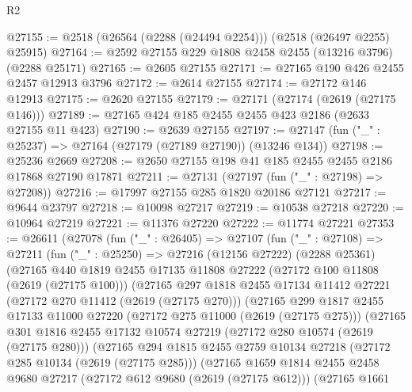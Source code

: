 \begin{lexlean}{R2}
\begin{coremodule}
@27155 := @2518 (@26564 (@2288 (@24494 @2254))) (@2518 (@26497 @2255) @25915)
@27164 := @2592 @27155 @229 @1808 @2458 @2455 (@13216 @3796) (@2288 @25171)
@27165 := @2605 @27155
@27171 := @27165 @190 @426 @2455 @2457 @12913 @3796
@27172 := @2614 @27155
@27174 := @27172 @146 @12913
@27175 := @2620 @27155
@27179 := @27171 (@27174 (@2619 (@27175 @146)))
@27189 := @27165 @424 @185 @2455 @2455 @423 @2186 (@2633 @27155 @11 @423)
@27190 := @2639 @27155
@27197 := @27147 (fun ("_" : @25237) => @27164 (@27179 (@27189 @27190)) (@13246 @134))
@27198 := @25236 @2669
@27208 := @2650 @27155 @198 @41 @185 @2455 @2455 @2186 @17868 @27190 @17871
@27211 := @27131 (@27197 (fun ("_" : @27198) => @27208))
@27216 := @17997 @27155 @285 @1820 @20186 @27121
@27217 := @9644 @23797
@27218 := @10098 @27217
@27219 := @10538 @27218
@27220 := @10964 @27219
@27221 := @11376 @27220
@27222 := @11774 @27221
@27353 := @26611
    (@27078
      (fun ("_" : @26405) =>
      @27107
        (fun ("_" : @27108) =>
        @27211
          (fun ("_" : @25250) =>
          @27216
            (@12156 @27222)
            (@2288 @25361)
            (@27165
              @440
              @1819
              @2455
              @17135
              @11808
              @27222
              (@27172 @100 @11808 (@2619 (@27175 @100)))
              (@27165
                @297
                @1818
                @2455
                @17134
                @11412
                @27221
                (@27172 @270 @11412 (@2619 (@27175 @270)))
                (@27165
                  @299
                  @1817
                  @2455
                  @17133
                  @11000
                  @27220
                  (@27172 @275 @11000 (@2619 (@27175 @275)))
                  (@27165
                    @301
                    @1816
                    @2455
                    @17132
                    @10574
                    @27219
                    (@27172 @280 @10574 (@2619 (@27175 @280)))
                    (@27165
                      @294
                      @1815
                      @2455
                      @2759
                      @10134
                      @27218
                      (@27172 @285 @10134 (@2619 (@27175 @285)))
                      (@27165
                        @1659
                        @1814
                        @2455
                        @2458
                        @9680
                        @27217
                        (@27172 @612 @9680 (@2619 (@27175 @612)))
                        (@27165
                          @1661

\end{coremodule}
\end{lexlean}

